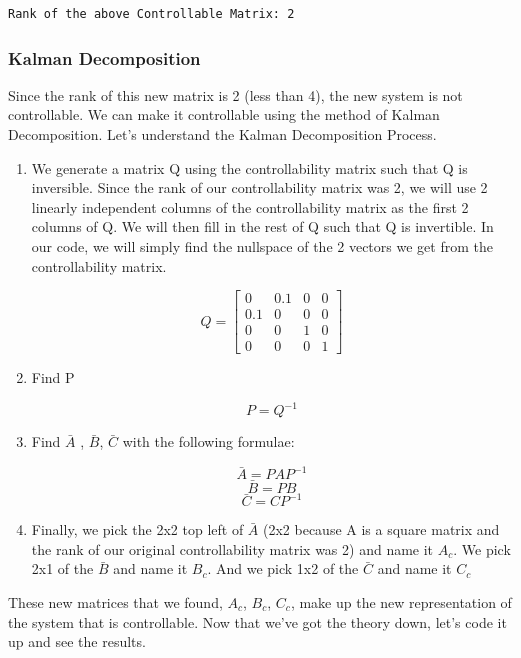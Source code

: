 \documentclass[11pt]{article}
\begin{document}
    \begin{Verbatim}[commandchars=\\\{\}]
Rank of the above Controllable Matrix: 2
    \end{Verbatim}

\subsubsection{Kalman Decomposition}\label{kalman-decomposition}

Since the rank of this new matrix is 2 (less than 4), the new system is
not controllable. We can make it controllable using the method of Kalman
Decomposition. Let's understand the Kalman Decomposition Process.

\begin{enumerate}
\def\labelenumi{\arabic{enumi}.}
\item
  We generate a matrix Q using the controllability matrix such that Q is
  inversible. Since the rank of our controllability matrix was 2, we
  will use 2 linearly independent columns of the controllability matrix
  as the first 2 columns of Q. We will then fill in the rest of Q such
  that Q is invertible. In our code, we will simply find the nullspace
  of the 2 vectors we get from the controllability matrix.

  \[Q = \begin{bmatrix} 0 & 0.1 & 0 & 0 \\ 0.1 & 0 & 0 & 0 \\ 0 & 0 & 1 & 0\\ 0 & 0 & 0 & 1 \end{bmatrix}\]
\item
  Find P

  \[ P = Q^{-1} \]
\item
  Find $ \bar{A} $ , $ \bar{B} $, $ \bar{C} $ with the
  following formulae:

  \[ \bar{A} = PAP^{-1} \] \[ \bar{B} = PB \] \[ \bar{C} = CP^{-1} \]
\item
  Finally, we pick the 2x2 top left of $ \bar{A} $ (2x2 because A is
  a square matrix and the rank of our original controllability matrix
  was 2) and name it $ A_c $. We pick 2x1 of the $ \bar{B} $ and
  name it $ B_c $. And we pick 1x2 of the $ \bar{C} $ and name it
  $ C_c $
\end{enumerate}

These new matrices that we found, $ A_c $, $ B_c $, $ C_c $,
make up the new representation of the system that is controllable. Now
that we've got the theory down, let's code it up and see the results.
\end{document}
